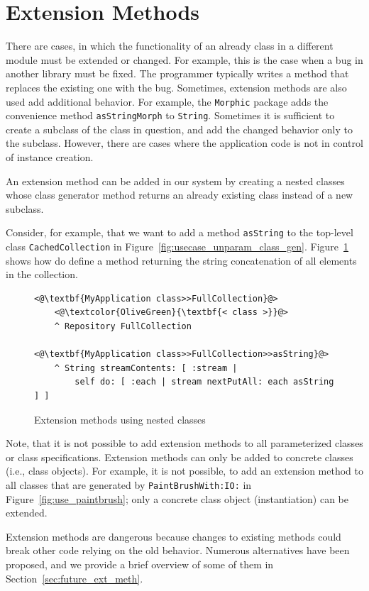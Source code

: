 \section{Extension Methods}
\label{sec:usecases_ext_meth}
There are cases, in which the functionality of an already class in a different module must be extended or changed. For example, this is the case when a bug in another library must be fixed. The programmer typically writes a method that replaces the existing one with the bug. Sometimes, extension methods are also used add additional behavior. For example, the \texttt{Morphic} package adds the convenience method \texttt{asStringMorph} to \texttt{String}. Sometimes it is sufficient to create a subclass of the class in question, and add the changed behavior only to the subclass. However, there are cases where the application code is not in control of instance creation.

An extension method can be added in our system by creating a nested classes whose class generator method returns an already existing class instead of a new subclass.

Consider, for example, that we want to add a method \texttt{asString} to the top-level class \texttt{CachedCollection} in Figure~\ref{fig:usecase_unparam_class_gen}. Figure~\ref{fig:use_ext_meth} shows how do define a method returning the string concatenation of all elements in the collection.

\begin{figure}[!htp]
\begin{lstlisting}
<@\textbf{MyApplication class>>FullCollection}@>
    <@\textcolor{OliveGreen}{\textbf{< class >}}@>
    ^ Repository FullCollection

<@\textbf{MyApplication class>>FullCollection>>asString}@>
    ^ String streamContents: [ :stream |
        self do: [ :each | stream nextPutAll: each asString ] ]
\end{lstlisting}
\caption{Extension methods using nested classes}
\label{fig:use_ext_meth}
\end{figure}

Note, that it is not possible to add extension methods to all parameterized classes or class specifications. Extension methods can only be added to concrete classes (i.e., class objects). For example, it is not possible, to add an extension method to all classes that are generated by \texttt{PaintBrushWith:IO:} in Figure~\ref{fig:use_paintbrush}; only a concrete class object (instantiation) can be extended.

Extension methods are dangerous because changes to existing methods could break other code relying on the old behavior. Numerous alternatives have been proposed, and we provide a brief overview of some of them in Section~\ref{sec:future_ext_meth}.
